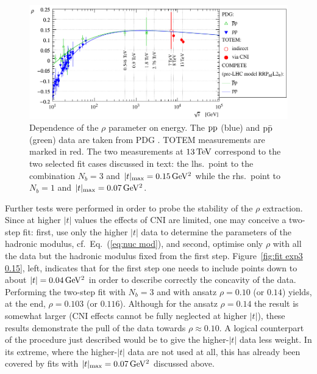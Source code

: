 \begin{figure}
\vskip-5mm
\begin{center}
\includegraphics{fig/rho_vs_s.pdf}
\caption{%
Dependence of the $\rho$ parameter on energy. The $\rm pp$ (blue) and $\rm p\bar p$ (green) data are taken from PDG \cite{pdg-2010}. TOTEM measurements are marked in red. The two measurements at $13\,{\rm TeV}$ correspond to the two selected fit cases discussed in text: the lhs.~point to the combination $N_b = 3$ and $|t|_{\rm max} = 0.15\,{\rm GeV^2}$ while the rhs.~point to $N_b = 1$ and $|t|_{\rm max} = 0.07\,{\rm GeV^2}$.
}
\label{fig:rho_vs_s}
\end{center}
\end{figure}

Further tests were performed in order to probe the stability of the $\rho$ extraction. Since at higher $|t|$ values the effects of CNI are limited, one may conceive a two-step fit: first, use only the higher $|t|$ data to determine the parameters of the hadronic modulus, cf.~Eq.~(\ref{eq:nuc mod}), and second, optimise only $\rho$ with all the data but the hadronic modulus fixed from the first step. Figure~\ref{fig:fit exp3 0.15}, left, indicates that for the first step one needs to include points down to about $|t| = 0.04\,{\rm GeV^2}$ in order to describe correctly the concavity of the data. Performing the two-step fit with $N_b=3$ and with ansatz $\rho = 0.10$ (or $0.14$) yields, at the end, $\rho = 0.103$ (or $0.116$). %
Although for the ansatz $\rho = 0.14$ the result is somewhat larger (CNI effects cannot be fully neglected at higher $|t|$), these results demonstrate the pull of the data towards $\rho \approx 0.10$. A logical counterpart of the procedure just described would be to give the higher-$|t|$ data less weight. In its extreme, where the higher-$|t|$ data are not used at all, this has already been covered by fits with $|t|_{\rm max} = 0.07\,{\rm GeV^2}$ discussed above.

